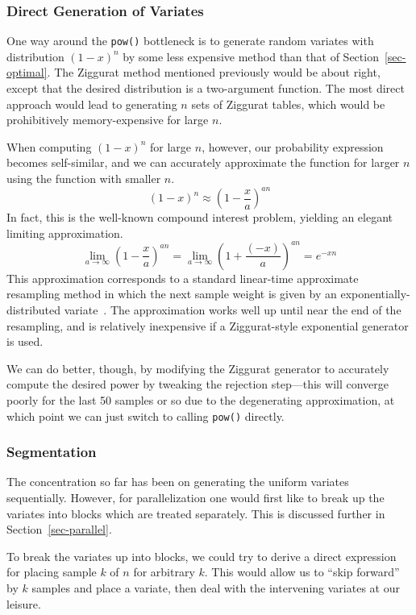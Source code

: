 \documentclass[12pt]{article}
\begin{document}
\subsubsection{Direct Generation of Variates}

  One way around the {\tt pow()} bottleneck is to generate
  random variates with distribution $(1 - x)^n$ by
  some less expensive method than that of
  Section~\ref{sec-optimal}.  The Ziggurat method mentioned
  previously would be about right, except that the desired
  distribution is a two-argument function.  The most direct
  approach would lead to generating $n$ sets of Ziggurat
  tables, which would be prohibitively memory-expensive for
  large $n$.

  
  When computing $(1 - x)^n$ for large $n$, however, our
  probability expression becomes self-similar, and we can
  accurately approximate the function for larger $n$ using
  the function with smaller $n$. $$
    (1 - x)^n \approx \left(1 - \frac{x}{a}\right)^{an}
  $$
  In fact, this is the well-known compound interest problem,
  yielding an elegant limiting approximation. $$
  \lim_{a \rightarrow \infty}\left(1 - \frac{x}{a}\right)^{an}
  =   \lim_{a \rightarrow \infty}\left(1 + \frac{(-x)}{a}\right)^{an}
  = e^{-xn}$$  This approximation corresponds to a standard 
  linear-time approximate resampling method in which the next sample
  weight is given by an exponentially-distributed
  variate~\cite{carpenter}.  The approximation works well up until near the
  end of the resampling, and is relatively inexpensive if a
  Ziggurat-style exponential generator is used.

  We can do better, though, by modifying the Ziggurat
  generator to accurately compute the desired power by
  tweaking the rejection step---this will converge poorly
  for the last 50 samples or so due to the degenerating
  approximation, at which point we can just switch to
  calling {\tt pow()} directly.

\subsubsection{Segmentation}\label{sec-segment}

  The concentration so far has been on generating the uniform
  variates sequentially.  However, for parallelization one
  would first like to break up the variates into blocks which
  are treated separately.  This is discussed further in
  Section~\ref{sec-parallel}.

  To break the variates up into blocks, we could try to
  derive a direct expression for placing sample $k$ of $n$
  for arbitrary $k$.  This would allow us to ``skip forward''
  by $k$ samples and place a variate, then deal with the
  intervening variates at our leisure.
\end{document}
